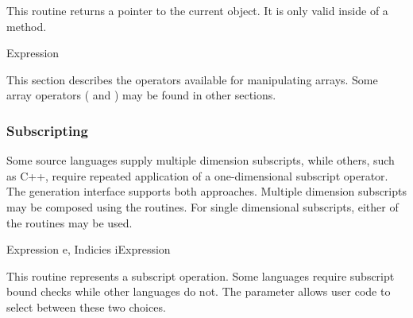 \begin{functionality}
This routine returns a pointer to the current object.  It is only
valid inside of a method.
\end{functionality}

\begin{functionality}
\cxxOp
\end{functionality}
\begin{functionality}
\cxxOp
\end{functionality}
\begin{functionality}
\cxxOp
\end{functionality}
	{Expression}
\begin{functionality}
\cxxOp
\end{functionality}

This section describes the operators available for manipulating
arrays.  Some array operators (\eg {} and
) may be found in other sections.

\subsubsection{Subscripting}
Some source languages supply multiple dimension subscripts, while
others, such as C++, require repeated application of a one-dimensional
subscript operator.  The generation interface supports both
approaches.  Multiple dimension subscripts may be composed using the
 routines.  For single dimensional subscripts, either
of the  routines may be used.

\begin{functionality}
\end{functionality}
	{Expression e, Indicies i}{Expression}
\begin{functionality}
This routine represents a subscript operation.  Some languages require
subscript bound checks while other languages do not.  The
 parameter allows user code to select between
these two choices.
\end{functionality}

